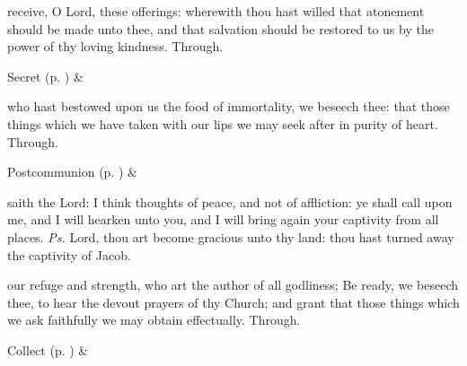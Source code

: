 

\secret
{} receive, O Lord, these offerings: wherewith thou hast willed that atonement should be made unto thee, and that salvation should be restored to us by the power of thy loving kindness. Through.
\begin{rubric}
     Secret  (p. \pageref{SPSaints}) \&  
\end{rubric}


\clearpage
\postcommunion
{} who hast bestowed upon us the food of immortality, we beseech thee: that those things which we have taken with our lips we may seek after in purity of heart. Through.
\begin{rubric}
     Postcommunion  (p. \pageref{SPSaints}) \&  
\end{rubric}




\introit
{} saith the Lord: I think thoughts of peace, and not of affliction: ye shall call upon me, and I will hearken unto you, and I will bring again your captivity from all places. \textit{Ps.} Lord, thou art become gracious unto thy land: thou hast turned away the captivity of Jacob.

\collect
{} our refuge and strength, who art the author of all godliness; Be ready, we beseech thee, to hear the devout prayers of thy Church; and grant that those things which we ask faithfully we may obtain effectually. Through.
\begin{rubric}
     Collect  (p. \pageref{SPSaints}) \&  
\end{rubric}

